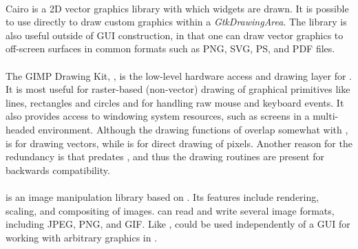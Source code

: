 \documentclass[article]{jss}
\begin{document}
\paragraph[Cairo]{} 

Cairo is a 2D vector graphics library with which  widgets
are drawn. It is possible to use  directly to draw custom
graphics within a \emph{GtkDrawingArea}. The library is also useful
outside of GUI construction, in that one can draw vector graphics to
off-screen surfaces in common formats such as PNG, SVG, PS, and PDF
files.

\paragraph[GDK]{}

The GIMP Drawing Kit, , is the low-level hardware access and
drawing layer 
for . It is most useful for raster-based (non-vector)
drawing of graphical primitives like lines, rectangles and circles and
for handling raw mouse and keyboard events. It also provides access to
windowing system resources, such as screens in a multi-headed
environment. Although the drawing functions of  overlap somewhat with ,  is for drawing vectors, while  is for direct drawing of pixels. Another reason for the redundancy is that  predates , and thus the  drawing routines are present for backwards compatibility.

\paragraph[GdkPixbuf]{}

 is an image manipulation library based on .
Its features
include rendering, scaling, and compositing of images. 
can read
and write several image formats, including JPEG, PNG, and GIF. Like
,
 could be used independently of a GUI for working with
arbitrary 
graphics in . 
\end{document}
